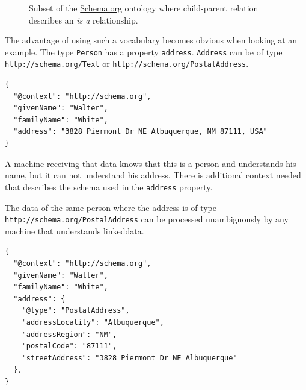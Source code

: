 \begin{figure}[!htb]
  \caption{\label{fig:schemaorg} Subset of the \url{Schema.org} ontology where child-parent relation describes an \textit{is a} relationship.}
\end{figure}

The advantage of using such a vocabulary becomes obvious when looking at an example. The type \lstinline{Person} has a property \lstinline{address}. \lstinline{Address} can be of type \lstinline{http://schema.org/Text} or \lstinline{http://schema.org/PostalAddress}.

\lstset{language=JSON}
\begin{lstlisting}[caption=A person with an address of type Text]
{
  "@context": "http://schema.org",
  "givenName": "Walter",
  "familyName": "White",
  "address": "3828 Piermont Dr NE Albuquerque, NM 87111, USA"
}
\end{lstlisting}

A machine receiving that data knows that this is a person and understands his name, but it can not understand his address. There is additional context needed that describes the schema used in the \lstinline{address} property.

The data of the same person where the address is of type \lstinline{http://schema.org/PostalAddress} can be processed unambiguously by any machine that understands \gls{linkeddata}.

\lstset{language=JSON}
\begin{lstlisting}[caption=A person with an address of type PostalAddress]
{
  "@context": "http://schema.org",
  "givenName": "Walter",
  "familyName": "White",
  "address": {
    "@type": "PostalAddress",
    "addressLocality": "Albuquerque",
    "addressRegion": "NM",
    "postalCode": "87111",
    "streetAddress": "3828 Piermont Dr NE Albuquerque"
  },
}
\end{lstlisting}

